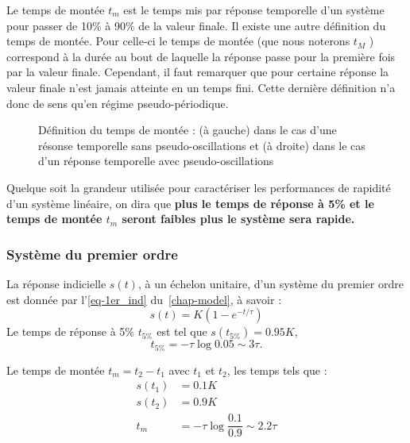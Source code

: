 Le temps de montée $t_m$ est le temps mis par réponse temporelle d'un système 
pour passer de 10\% à 90\% de la valeur finale. Il existe une autre 
définition du temps de montée. Pour celle-ci le temps de montée (que nous 
noterons $t_{M}$ ) correspond à la durée au bout de laquelle la 
réponse passe pour la première fois par la valeur finale. Cependant, 
il faut remarquer que pour certaine réponse la valeur finale n'est 
jamais atteinte en un temps fini. Cette dernière définition
n'a donc de sens qu'en régime pseudo-périodique.
\begin{figure}[!h]
    \centering
    
    
    \caption{Définition du temps de montée : (à gauche) dans le cas
             d'une résonse temporelle sans pseudo-oscillations et (à droite) 
             dans le cas d'un réponse temporelle avec pseudo-oscillations}
\end{figure}
Quelque soit la grandeur utilisée pour caractériser les performances de rapidité
d'un système linéaire, on dira que \textbf{plus le temps de réponse à 5\% et le
temps de montée $t_m$ seront faibles plus le système sera rapide.}

\subsubsection{Système du premier ordre}
La réponse indicielle $s(t)$, à un échelon unitaire, 
d'un système du premier ordre est donnée par l'\cref{eq-1er_ind} 
du~\cref{chap-model}, à savoir :
$$
s(t)=K\left(1-e^{-t/\tau}\right)
$$
Le temps de réponse à 5\% $t_{5\%}$ est tel que $s(t_{5\%})=0.95K$, 
$$
t_{5\%}=-\tau\log{0.05}\sim3\tau.
$$

Le temps de montée $t_m=t_2-t_1$ avec $t_1$ et $t_2$, les temps tels que :
\begin{align*}
    s(t_1)&=0.1K\\
    s(t_2)&=0.9K\\
    t_m   &=-\tau\log{\dfrac{0.1}{0.9}}\sim2.2\tau
\end{align*}

